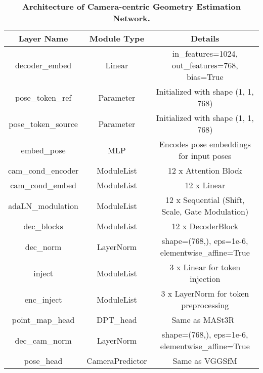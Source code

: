 \begin{table*}[h!]
\centering
\caption{\textbf{Architecture of Camera-centric Geometry Estimation Network.}}
\renewcommand{\arraystretch}{0.8} %
\setlength{\tabcolsep}{8pt} %
\begin{tabular}{ccc}
\toprule
\textbf{Layer Name} & \textbf{Module Type} & \textbf{Details} \\ \midrule
decoder\_embed & Linear & in\_features=1024, out\_features=768, bias=True \\
pose\_token\_ref & Parameter & Initialized with shape (1, 1, 768) \\
pose\_token\_source & Parameter & Initialized with shape (1, 1, 768) \\
embed\_pose & MLP & Encodes pose embeddings for input poses \\
cam\_cond\_encoder & ModuleList & 12 x Attention Block \\
cam\_cond\_embed & ModuleList & 12 x Linear \\
adaLN\_modulation & ModuleList & 12 x Sequential (Shift, Scale, Gate Modulation) \\
dec\_blocks & ModuleList & 12 x DecoderBlock \\
dec\_norm & LayerNorm & shape=(768,), eps=1e-6, elementwise\_affine=True \\
inject & ModuleList & 3 x Linear for token injection \\
enc\_inject & ModuleList & 3 x LayerNorm for token preprocessing \\
point\_map\_head & DPT\_head & Same as  MASt3R~\cite{leroy2024grounding} \\
dec\_cam\_norm & LayerNorm & shape=(768,), eps=1e-6, elementwise\_affine=True \\ 
pose\_head & CameraPredictor & Same as VGGSfM \cite{wang2024vggsfm} \\
\bottomrule
\end{tabular}
\label{tab:camera_geometry_estimation}
\end{table*}


